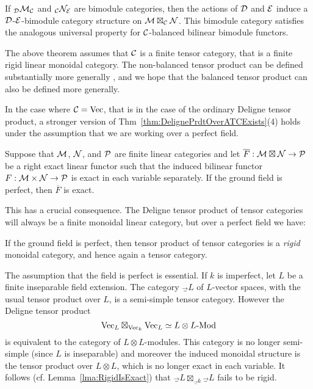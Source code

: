 \documentclass{amsart}
\begin{document}
\begin{remark}
	If ${}_{\mathcal D}\mathcal M_{\mathcal C}$ and ${}_{\mathcal C}\mathcal N_{\mathcal E}$ are bimodule categories, then the actions of $\mathcal D$ and $\mathcal E$ induce a $\mathcal D$-$\mathcal E$-bimodule category structure on $\mathcal M \boxtimes_{\mathcal C} \mathcal N$. This bimodule category satisfies the analogous universal property for $\mathcal C$-balanced bilinear bimodule functors.
\end{remark}

\begin{remark}
The above theorem assumes that $\mathcal C$ is a finite tensor category, that is a finite rigid linear monoidal category.  The non-balanced tensor product can be defined substantially more generally \cite{1212.1545}, and we hope that the balanced tensor product can also be defined more generally.
\end{remark}

In the case where $\mathcal C = \mathrm{Vec}$, that is in the case of the ordinary Deligne tensor product, a stronger version of Thm~\ref{thm:DelignePrdtOverATCExists}(4) holds under the assumption that we are working over a perfect field.

\begin{lemma}[{\cite[Pr.~5.13(vi)]{MR1106898}}]%
	Suppose that $\mathcal M$, $\mathcal N$, and $\mathcal P$ are finite linear categories and let $\overline{F}: \mathcal M \boxtimes \mathcal N \to \mathcal P$ be a right exact linear functor such that the induced bilinear functor $F: \mathcal M \times \mathcal N \to \mathcal P$ is exact in each variable separately. If the ground field is perfect, then $\overline{F}$ is exact. 
\end{lemma}

This has a crucial consequence. The Deligne tensor product of tensor categories will always be a finite monoidal linear category, but over a perfect field we have:

\begin{corollary}[{\cite[Pr.~5.17]{MR1106898}}]%
	If the ground field is perfect, then tensor product of tensor categories is a {\em rigid} monoidal category, and hence again a tensor category. 
\end{corollary}

\begin{example}
	The assumption that the field is perfect is essential. If $k$ is imperfect, let $L$ be a finite inseparable field extension. The category $\Vec_L$ of $L$-vector spaces, with the usual tensor product over $L$, is a semi-simple tensor category. However the Deligne tensor product
	\begin{equation*}
		\Vec_L \boxtimes_{\Vec_k} \Vec_L \simeq \Mod{L\otimes L}{}
	\end{equation*} 
	is equivalent to the category of $L \otimes L$-modules. This category is no longer semi-simple (since $L$ is inseparable) and moreover the induced monoidal structure is the tensor product over $L \otimes L$, which is no longer exact in each variable. It follows (cf. Lemma~\ref{lma:RigidIsExact}) that $\Vec_L \boxtimes_{\Vec_k} \Vec_L$ fails to be rigid. 
\end{example}
\end{document}
